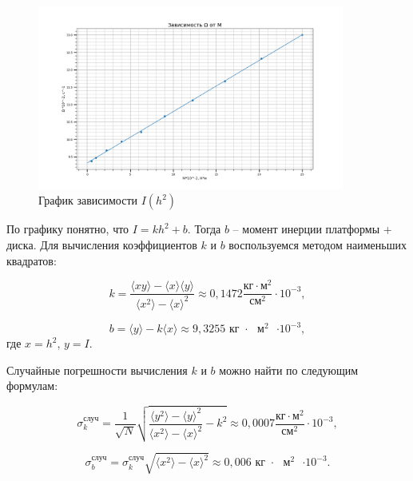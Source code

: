 \documentclass[a4paper,12pt]{article}
\begin{document}
	\begin{figure}[!h]
		\begin{center}
			\includegraphics[width=0.9\textwidth]{graf.png}
			\caption{График зависимости $ I(h^2) $}
			\label{ris:grafik}
		\end{center}
	\end{figure}
	
	По графику понятно, что $I = kh^2 + b$. Тогда $b$ -- момент инерции платформы + диска. Для вычисления коэффициентов $ k $ и $ b $ воспользуемся методом наименьших квадратов:
	
	\begin{equation}
		k=\frac{\langle xy\rangle-\langle x\rangle \langle y\rangle}{\langle x^2\rangle - \langle x\rangle^2}\approx 0,1472 \frac{\text{кг}\cdot\text{м}^2}{\text{см}^2}\cdot 10^{-3},
	\end{equation}
	
	\begin{equation}
		b=\langle y \rangle -k\langle x \rangle\approx 9,3255\text{  кг $\cdot$ $\text{м}^2$ $\cdot 10^{-3}$},
	\end{equation}
	где $ x=h^2 $, $ y=I $.
	
	Случайные погрешности вычисления $ k $ и $ b $ можно найти по следующим формулам:
	
	\begin{equation}
		\sigma_k^\text{случ}=\frac{1}{\sqrt{N}}\sqrt{\frac{\langle y^2 \rangle - \langle y \rangle^2}{\langle x^2 \rangle - \langle x \rangle^2} - k^2  } \approx 0,0007 \frac{\text{кг}\cdot\text{м}^2}{\text{см}^2}\cdot 10^{-3},
	\end{equation}
	
	\begin{equation}
		\sigma_b^\text{случ}= \sigma_k^\text{случ} \sqrt{\langle x^2 \rangle - \langle x \rangle^2} \approx 0,006 \text{  кг $\cdot$ $\text{м}^2$ $\cdot 10^{-3}$}.
	\end{equation}
	
\end{document}
